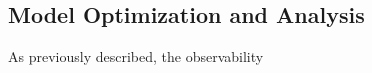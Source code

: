 \subsection{Model Optimization and Analysis}

As previously described, the observability 

\subsubsection{}